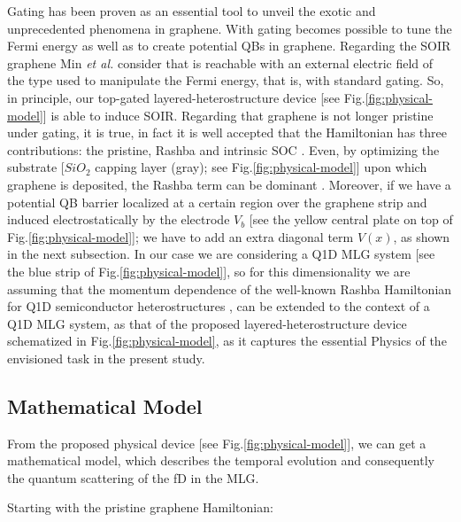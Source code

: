 Gating has been proven as an essential tool to unveil the exotic and unprecedented phenomena in graphene. With gating becomes possible to tune the Fermi energy as well as to create potential QBs in graphene\cite{Young2009}. Regarding the SOIR graphene Min \textit{et al.} \cite{Min2006} consider that is reachable with an external electric field of the type used to manipulate the Fermi energy, that is, with standard gating. So, in principle, our top-gated layered-heterostructure device [see Fig.\ref{fig:physical-model}] is able to induce SOIR\cite{Serna2019}.
Regarding that graphene is not longer pristine under gating, it is true, in fact it is well accepted that the Hamiltonian has three contributions: the pristine, Rashba and intrinsic SOC \cite{Qiao2012, Qiao2013, Min2006}. Even, by optimizing the substrate [$SiO_2$ capping layer (gray); see Fig.\ref{fig:physical-model}] upon which graphene is deposited, the Rashba term can be dominant \cite{Varykhalov2008}. Moreover, if we have a potential QB barrier localized at a certain region over the graphene strip and induced electrostatically by the electrode $V_{b}$ [see the yellow central plate on top of Fig.\ref{fig:physical-model}]; we have to add an extra diagonal term $V(x)$, as shown in the next subsection. In our case we are considering a Q1D MLG system [see the blue strip of Fig.\ref{fig:physical-model}], so for this dimensionality we are assuming that the momentum dependence of the well-known Rashba Hamiltonian for Q1D semiconductor heterostructures \cite{RDiago2010, RCDiagoEPL2015}, can be extended to the context of a Q1D MLG system, as that of the proposed layered-heterostructure device schematized in Fig.\ref{fig:physical-model}, as it captures the essential Physics of the envisioned task in the present study. 

\subsection{Mathematical Model}\label{subsec:mathematical-model}

From the proposed physical device [see Fig.\ref{fig:physical-model}], we can get a mathematical model, which describes the temporal evolution and consequently the quantum scattering of the fD in the MLG.

Starting with the pristine graphene Hamiltonian\cite{Geimk2007}:

